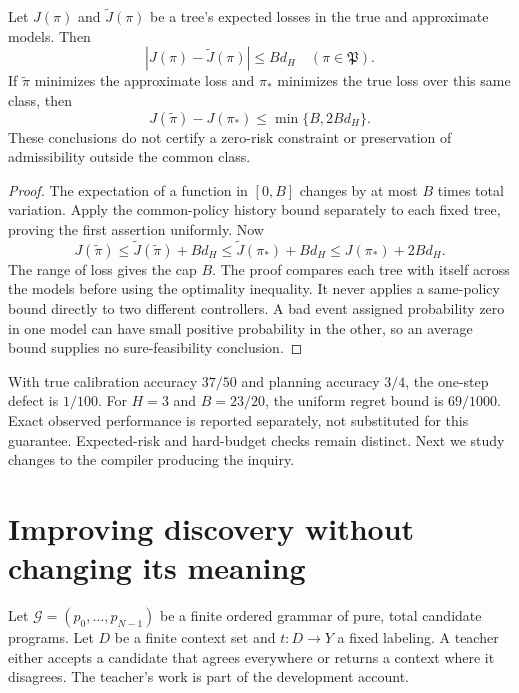 \begin{proposition}\label{r:policy-error}
Let $J(\pi)$ and $\widetilde J(\pi)$ be a tree's expected losses in the true and approximate models. Then
\[
 |J(\pi)-\widetilde J(\pi)|\le Bd_H\quad(\pi\in\mathfrak P).
\]
If $\widetilde\pi$ minimizes the approximate loss and $\pi_*$ minimizes the true loss over this same class, then
\[
 J(\widetilde\pi)-J(\pi_*)\le\min\{B,2Bd_H\}.
\]
These conclusions do not certify a zero-risk constraint or preservation of admissibility outside the common class.
\end{proposition}
\begin{proof}
The expectation of a function in $[0,B]$ changes by at most $B$ times total variation. Apply the common-policy history bound separately to each fixed tree, proving the first assertion uniformly. Now
\[
 J(\widetilde\pi)\le\widetilde J(\widetilde\pi)+Bd_H
 \le\widetilde J(\pi_*)+Bd_H\le J(\pi_*)+2Bd_H.
\]
The range of loss gives the cap $B$. The proof compares each tree with itself across the models before using the optimality inequality. It never applies a same-policy bound directly to two different controllers. A bad event assigned probability zero in one model can have small positive probability in the other, so an average bound supplies no sure-feasibility conclusion.
\end{proof}

With true calibration accuracy $37/50$ and planning accuracy $3/4$, the one-step defect is $1/100$. For $H=3$ and $B=23/20$, the uniform regret bound is $69/1000$. Exact observed performance is reported separately, not substituted for this guarantee. Expected-risk and hard-budget checks remain distinct. Next we study changes to the compiler producing the inquiry.

\chapter{Improving discovery without changing its meaning}\label{ch:discovery}
Let $\mathcal G=(p_0,\ldots,p_{N-1})$ be a finite ordered grammar of pure, total candidate programs. Let $D$ be a finite context set and $t:D\to Y$ a fixed labeling. A teacher either accepts a candidate that agrees everywhere or returns a context where it disagrees. The teacher's work is part of the development account.

